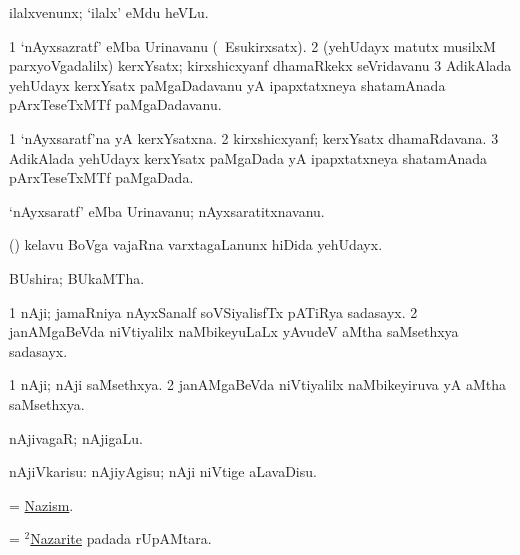 \noindent
\gl{\akirx}
\bmng
ilalxvenunx; `ilalx' eMdu heVLu. 
\emng
\eentry

\bentry
{}
\gl{\nA}
\bmng
\bnum
\num{1} `nAyxsazratf' eMba Urinavanu (\kanmu\ Esukirxsatx). 
\num{2} (yehUdayx matutx musilxM parxyoVgadalilx) kerxYsatx; kirxshicxyanf dhamaRkekx seVridavanu 
\num{3} AdikAlada yehUdayx kerxYsatx paMgaDadavanu yA ipapxtatxneya shatamAnada pArxTeseTxMTf paMgaDadavanu. 
\enum
\emng
\eentry

\bentry
{}
\gl{\gu}
\bmng
\bnum
\num{1} `nAyxsaratf'na yA kerxYsatxna. 
\num{2} kirxshicxyanf; kerxYsatx dhamaRdavana. 
\num{3} AdikAlada yehUdayx kerxYsatx paMgaDada yA ipapxtatxneya shatamAnada pArxTeseTxMTf paMgaDada. 
\enum
\emng
\eentry

\bentry
{}
\gl{\nA}
\bmng
`nAyxsaratf' eMba Urinavanu; nAyxsaratitxnavanu. 
\emng
\eentry

\bentry
{}
\gl{\nA}
\bmng
(\ca) kelavu BoVga vajaRna varxtagaLanunx hiDida yehUdayx. 
\emng
\eentry

\bentry
{}
\gl{\nA}
\bmng
BUshira; BUkaMTha. 
\emng
\eentry

\bentry
{}
\gl{\nA}
\bmng
\bnum
\num{1} nAji; jamaRniya nAyxSanalf soVSiyalisfTx pATiRya sadasayx. 
\num{2} janAMgaBeVda niVtiyalilx naMbikeyuLaLx yAvudeV aMtha saMsethxya sadasayx. 
\enum
\emng
\eentry

\bentry
{}
\gl{\gu}
\bmng
\bnum
\num{1} nAji; nAji saMsethxya. 
\num{2} janAMgaBeVda niVtiyalilx naMbikeyiruva yA aMtha saMsethxya. 
\enum
\emng
\eentry

\bentry
{}
\gl{\nA}
\bmng
nAjivagaR; nAjigaLu. 
\emng
\eentry

\bentry
{}
\gl{\sakirx}
\bmng
 nAjiVkarisu: nAjiyAgisu; nAji niVtige aLavaDisu. 
\emng
\eentry

\bentry
{}
\gl{\nA}
\bmng
= \hyperlink{Nazism}{Nazism}. 
\emng
\eentry

\bentry
{}
\gl{\nA}
\bmng
= \hyperlink{Nazarite(2)}{$^2$Nazarite} padada rUpAMtara. 
\emng
\eentry

